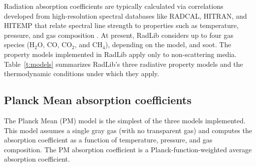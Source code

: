 \documentclass[preprint,12pt]{elsarticle}
\begin{document}
Radiation absorption coefficients are typically calculated via correlations developed from high-resolution spectral databases like RADCAL, HITRAN, and HITEMP \citep{Grosshandler_1993,Rothman_2010} that relate spectral line strength to properties such as temperature, pressure, and gas composition \citep{Zhang_2002b}. At present, RadLib considers up to four gas species (H$_2$O, CO, CO$_2$, and CH$_4$), depending on the model, and soot. The property models implemented in RadLib apply only to non-scattering media. Table~\ref{t:models} summarizes RadLib's three radiative property models and the thermodynamic conditions under which they apply.

\begin{table}
    \caption{Summary of radiative property models and ranges of applicability. For the WSGG model the pressure range is given in terms of the pressure-path length product.}
\label{t:models}
\centering
{}
\end{table}

\subsection{Planck Mean absorption coefficients} \label{s:planckmean}

The Planck Mean (PM) model is the simplest of the three models implemented. This model assumes a single gray gas (with no transparent gas) and computes the absorption coefficient as a function of temperature, pressure, and gas composition. The PM absorption coefficient is a Planck-function-weighted average absorption coefficient.
\end{document}
